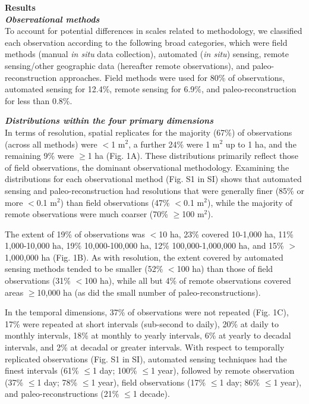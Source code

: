 \documentclass[12pt]{article}
\begin{document}
\noindent \textbf{Results}\\
\noindent \textbf{\emph{Observational methods}}\\
To account for potential differences in scales related to methodology, we classified each observation according to the following broad categories, which were field methods (manual \emph{in situ} data collection), automated (\emph{in situ}) sensing, remote sensing/other geographic data (hereafter remote observations), and paleo-reconstruction approaches. Field methods were used for 80\% of observations, automated sensing for 12.4\%, remote sensing for 6.9\%, and paleo-reconstruction for less than 0.8\%. 

\noindent \textbf{\emph{Distributions within the four primary dimensions}}\\
In terms of resolution, spatial replicates for the majority (67\%) of observations (across all methods) were $<$1 m$^2$, a further 24\% were 1 m$^2$ up to 1 ha, and the remaining 9\% were $\geq$1 ha (Fig. 1A). These distributions primarily reflect those of field observations, the dominant observational methodology. Examining the distributions for each observational method (Fig. S1 in SI) shows that automated sensing and paleo-reconstruction had resolutions that were generally finer (85\% or more $<$0.1 m$^2$) than field observations (47\% $<$0.1 m$^2$), while the majority of remote observations were much coarser (70\% $\geq$100 m$^2$).   

The extent of 19\% of observations was $<$10 ha, 23\% covered 10-1,000 ha, 11\% 1,000-10,000 ha, 19\% 10,000-100,000 ha, 12\% 100,000-1,000,000 ha, and 15\% $>$1,000,000 ha (Fig. 1B).  As with resolution, the extent covered by automated sensing methods tended to be smaller (52\% $<$100 ha) than those of field observations (31\% $<$100 ha), while all but 4\% of remote observations covered areas $\geq$10,000 ha (as did the small number of paleo-reconstructions).  


In the temporal dimensions, 37\% of observations were not repeated (Fig. 1C), 17\% were repeated at short intervals (sub-second to daily), 20\% at daily to monthly intervals, 18\% at monthly to yearly intervals, 6\% at yearly to decadal intervals, and 2\% at decadal or greater intervals. With respect to temporally replicated observations (Fig. S1 in SI), automated sensing techniques had the finest intervals (61\% $\leq$1 day; 100\% $\leq$1 year), followed by remote observation (37\% $\leq$1 day; 78\% $\leq$1 year), field observations (17\% $\leq$1 day; 86\% $\leq$1 year), and paleo-reconstructions (21\% $\leq$1 decade).   
\end{document}
